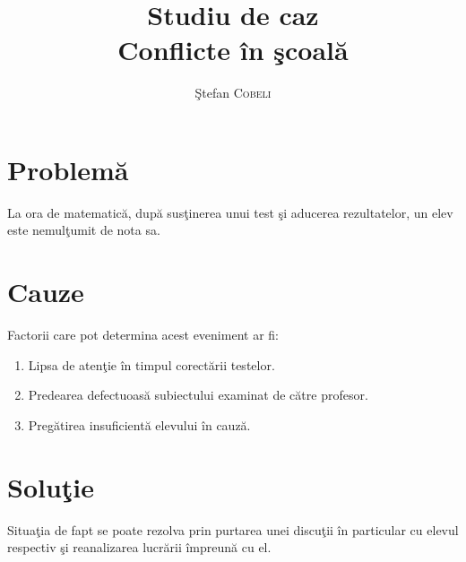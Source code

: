 \documentclass{article}
\title{\textbf{Studiu de caz } \\Conflicte \^ in \c scoal\u a \\  } %
\author{\c Stefan \textsc{Cobeli}} %
\begin{document}
\maketitle %




\section{Problem\u a}
La ora de matematic\u a, dup\u a sus\c tinerea unui test \c si aducerea rezultatelor, un elev este nemul\c tumit de nota sa.


\label{definitions}

\section{Cauze}
Factorii care pot determina acest eveniment ar fi:

\begin{enumerate}

\item Lipsa de aten\c tie \^ in timpul corect\u arii testelor.
\item Predearea defectuoas\u a subiectului examinat de c\u atre profesor.
\item Preg\u atirea insuficient\u a elevului \^ in cauz\u a.


\end{enumerate}




\section{Solu\c tie}

Situa\c tia de fapt se poate rezolva prin purtarea unei discu\c tii \^ in particular cu elevul respectiv \c si reanalizarea lucr\u arii \^ impreun\u a cu el.
\end{document}
